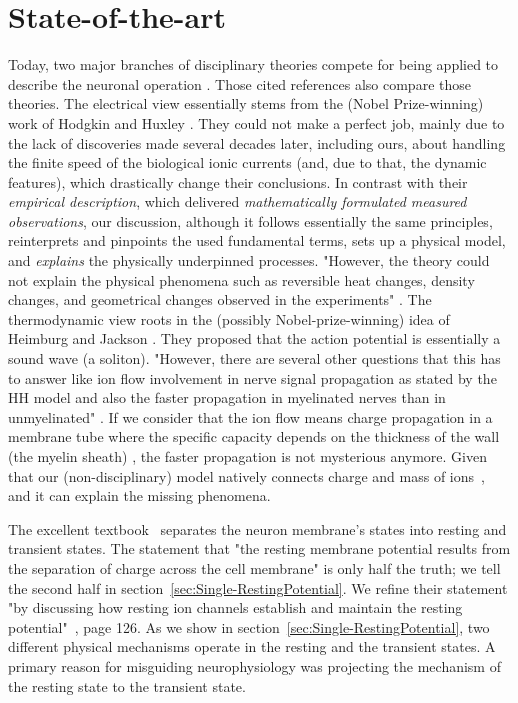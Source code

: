 \section{State-of-the-art\label{Physiology-StateOfTheArt}}

Today, two major branches of disciplinary theories compete 
for being applied to describe the neuronal operation \cite{CriticalElectricity:2018,ThermodynamicAPDrukarch:2022,PerspectivesNerveSignalPropagation:2024,ComparisonHHandSoliton:2010,HH_Potential_Controversies_2017,PiezoelectricNeuron:2025}. Those cited references also compare those theories.
The electrical view essentially stems from the (Nobel Prize-winning) work of Hodgkin and Huxley \cite{HodgkinHuxley:1952}. They could not make a perfect job, mainly due to the lack of
discoveries made several decades later, including ours, about handling
the finite speed of the biological ionic currents (and, due to that, the dynamic features), which drastically change
their conclusions. In contrast with their \textit{empirical description}, which delivered \textit{mathematically formulated measured observations}, our discussion, although it follows essentially
the same principles, reinterprets and pinpoints the used fundamental terms, sets up a physical model, and \textit{explains} the physically underpinned processes. "However, the theory could not explain the physical
phenomena such as reversible heat changes, density changes,
and geometrical changes observed in the experiments" \cite{ComparisonHHandSoliton:2010}.
The thermodynamic view roots in the (possibly Nobel-prize-winning)
idea of Heimburg and Jackson \cite{SolitonPropagation:2005}. They proposed that the action potential is essentially a sound wave (a soliton). "However, there are several other questions that this has to answer like ion flow involvement in nerve signal propagation as stated by the \gls{HH} model and also the faster propagation in myelinated nerves than in unmyelinated" \cite{ComparisonHHandSoliton:2010}.
If we consider that the ion flow means charge propagation in a membrane tube where the specific capacity depends on the thickness of the wall (the myelin sheath) \cite{VeghUnifiedCrossdisciplinaryModel:2026}, the faster propagation is not mysterious anymore.
Given that
our (non-disciplinary) model natively connects charge and mass of ions~\cite{VeghNon-ordinaryLaws:2025}, and it can explain the missing phenomena.


The excellent textbook~\cite{PrinciplesNeuralScience:2013} separates the neuron membrane's states into resting and transient states. The statement that "the resting membrane potential results
from the separation of charge across the
cell membrane" is only half the truth; we tell the second half in section~\ref{sec:Single-RestingPotential}. 
We refine their statement "by discussing how resting ion channels
establish and maintain the resting potential"~\cite{PrinciplesNeuralScience:2013}, page 126.
As we show in section~\ref{sec:Single-RestingPotential}, two different physical mechanisms
operate in the resting and the transient states. A primary reason for misguiding neurophysiology was projecting the mechanism of the resting state to the transient state.


